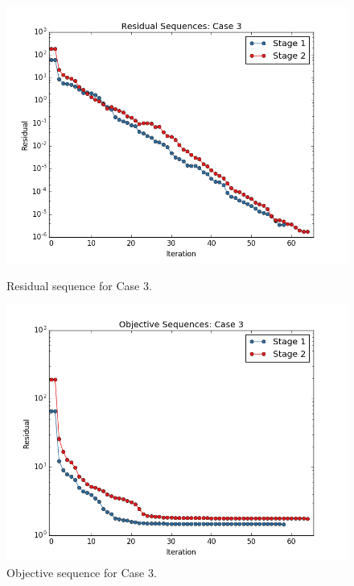 \documentclass[]{aiaa-tc}%
\begin{document}
\begin{figure}[!ht]
\centering
\begin{minipage}{.50\textwidth}
 \centering
 \includegraphics[width=.8\textwidth]{../images/residual_case3}
 \caption{Residual sequence for Case 3.}
 \label{fig:residual_case3}
\end{minipage}%
\begin{minipage}{.50\textwidth}
 \centering
 \includegraphics[width=.8\textwidth]{../images/objective_case3}
 \caption{Objective sequence for Case 3.}
 \label{fig:objective_case3}
\end{minipage}
\end{figure}
\end{document}
